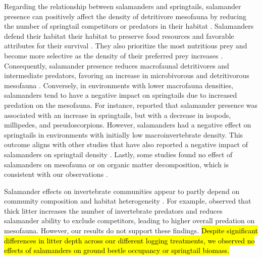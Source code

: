 Regarding the relationship between salamanders and springtails, salamander presence can positively affect the density of detritivore mesofauna by reducing the number of springtail competitors or predators in their habitat \citep{Wyman1998Experimentalassessment,Rooney2000impactsalamander,Walton2005Contrastingeffects,Walton2006Salamandersforestfloor}. 
Salamanders defend their habitat their habitat to preserve food resources and favorable attributes for their survival \citep{Gall2003BehavioralInteractions,Hickerson2004Behavioralinteractions,Hickerson2012Interactionsforestfloor}. 
They also prioritize the most nutritious prey and become more selective as the density of their preferred prey increases \citep{Jaeger1981Foragingtactics,Jaeger1982ForagingTactics}. 
Consequently, salamander presence reduces macrofaunal detritivores and intermediate predators, favoring an increase in microbivorous and detritivorous mesofauna \citep{Rooney2000impactsalamander,Walton2005Contrastingeffects,Walton2006Salamandersforestfloor}. 
Conversely, in environments with lower macrofauna densities, salamanders tend to have a negative impact on springtails due to increased predation on the mesofauna. 
For instance, \cite{Walton2006Salamandersforestfloor} reported that salamander presence was associated with an increase in springtails, but with a decrease in isopods, millipedes, and pseudoscorpions. 
However, salamanders had a negative effect on springtails in environments with initially low macroinvertebrate density. 
This outcome aligns with other studies that have also reported a negative impact of salamanders on springtail density \citep{Hickerson2017Easternredbacked}. 
Lastly, some studies found no effect of salamanders on mesofauna or on organic matter decomposition, which is consistent with our observations \citep{Hocking2013Effectsexperimental,Hocking2014Effectsredbacked}.

Salamander effects on invertebrate communities appear to partly depend on community composition and habitat heterogeneity \citep{MichaelWalton2005Salamandersforestfloor,Walton2006Salamandersforestfloor,Walton2013Topdownregulation,Best2014trophicrole}. 
For example, \cite{Walton2013Topdownregulation} observed that thick litter increases the number of invertebrate predators and reduces salamander ability to exclude competitors, leading to higher overall predation on mesofauna. 
However, our results do not support these findings. 
\hl{Despite significant differences in litter depth across our different logging treatments, we observed no effects of salamanders on ground beetle occupancy or springtail biomass.}

